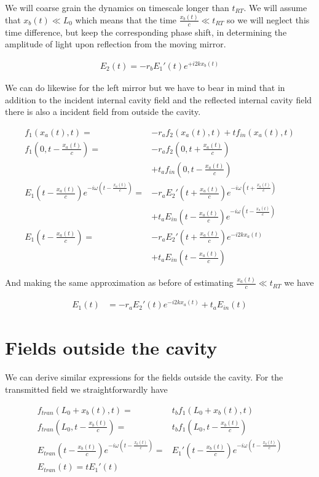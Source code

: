 \documentclass[12pt]{article}
\begin{document}
We will coarse grain the dynamics on timescale longer than $t_{RT}$. 
We will assume that $x_b(t) \ll L_0$ which means that the time $\frac{x_b(t)}{c} \ll t_{RT}$ so we will neglect this time difference, but keep the corresponding phase shift, in determining the amplitude of light upon reflection from the moving mirror.

\begin{align}
E_2(t) = -r_b E_1'(t)e^{+i2kx_b(t)}
\end{align}

We can do likewise for the left mirror but we have to bear in mind that in addition to the incident internal cavity field and the reflected internal cavity field there is also a incident field from outside the cavity.

\begin{align}
f_1(x_a(t), t) =& -r_a f_2(x_a(t), t) + t f_{in}(x_a(t), t)\\
f_1\left(0, t-\frac{x_a(t)}{c}\right) =& -r_a f_2\left(0, t+\frac{x_a(t)}{c}\right)\\
&+ t_a f_{in}\left(0, t-\frac{x_a(t)}{c}\right)\\
E_1\left(t-\frac{x_a(t)}{c}\right) e^{-i\omega\left(t-\frac{x_a(t)}{c}\right)} =& -r_aE_2'\left(t+\frac{x_a(t)}{c}\right)e^{-i \omega\left(t+\frac{x_a(t)}{c}\right)}\\
&+ t_a E_{in}\left(t-\frac{x_a(t)}{c}\right) e^{-i\omega\left(t-\frac{x_a(t)}{c}\right)}\\
E_1\left(t-\frac{x_a(t)}{c}\right) =& -r_aE_2'\left(t+\frac{x_a(t)}{c}\right)e^{-i2kx_a(t)}\\
&+ t_a E_{in}\left(t-\frac{x_a(t)}{c}\right)
\end{align}

And making the same approximation as before of estimating $\frac{x_a(t)}{c} \ll t_{RT}$ we have

\begin{align}
E_1(t) &= -r_a E_2'(t) e^{-i2kx_a(t)} + t_a E_{in}(t) 
\end{align}



\section{Fields outside the cavity}

We can derive similar expressions for the fields outside the cavity.
For the transmitted field we straightforwardly have

\begin{align}
f_{tran}(L_0+x_b(t), t) =& t_bf_1(L_0+x_b(t), t)\\
f_{tran}\left(L_0, t-\frac{x_b(t)}{c}\right) =& t_b f_1\left(L_0, t-\frac{x_b(t)}{c}\right)\\
E_{tran}\left(t-\frac{x_b(t)}{c}\right)e^{-i\omega\left(t-\frac{x_b(t)}{c}\right)} =& E_1'\left(t-\frac{x_b(t)}{c}\right)e^{-i\omega\left(t-\frac{x_b(t)}{c}\right)}\\
E_{tran}(t) = tE_1'(t)
\end{align}
\end{document}
